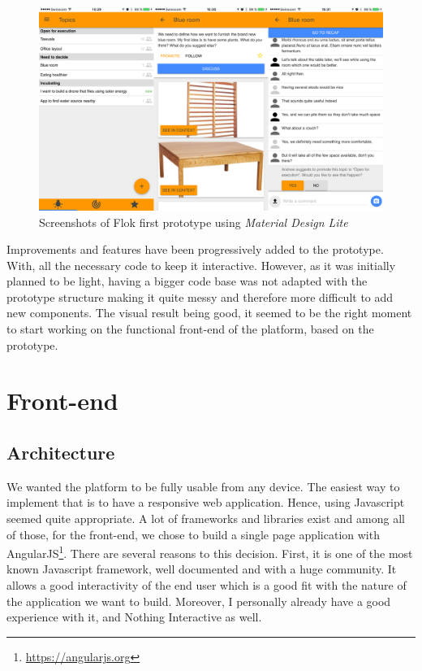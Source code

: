 \documentclass[a4paper,12pt,twoside]{article}
\begin{document}
\begin{figure}[!htb]
    \centering
    \includegraphics[width=\textwidth]{images/firstPrototypeScreenshots.png}
    \caption{Screenshots of Flok first prototype using \emph{Material Design Lite}}
    \label{fig.firstPrototypeScreenshots}
\end{figure}

Improvements and features have been progressively added to the prototype.
With, all the necessary code to keep it interactive.
However, as it was initially planned to be light, having a bigger code base was not adapted with the prototype structure making it quite messy and therefore more difficult to add new components.
The visual result being good, it seemed to be the right moment to start working on the functional front-end of the platform, based on the prototype.

\section{Front-end}
\subsection{Architecture}
\label{sec.architecture}
We wanted the platform to be fully usable from any device.
The easiest way to implement that is to have a responsive web application.
Hence, using Javascript seemed quite appropriate.
A lot of frameworks and libraries exist and among all of those, for the front-end, we chose to build a single page application with AngularJS\footnote{\url{https://angularjs.org}}.
There are several reasons to this decision.
First, it is one of the most known Javascript framework, well documented and with a huge community.
It allows a good interactivity of the end user which is a good fit with the nature of the application we want to build.
Moreover, I personally already have a good experience with it, and Nothing Interactive as well.
\end{document}
